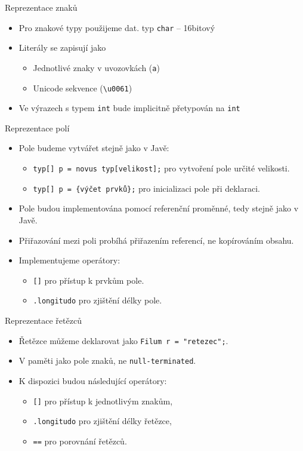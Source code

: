 \documentclass[11pt]{beamer}
\begin{document}
\begin{frame}{Reprezentace znaků}
\begin{itemize}
	\item Pro znakové typy použijeme dat. typ \texttt{char} -- 16bitový
	\item Literály se zapisují jako
	\begin{itemize}
		\item Jednotlivé znaky v uvozovkách (\texttt{\textsc{}a\textsc{}})
		\item Unicode sekvence (\texttt{\textsc{}\textbackslash u0061\textsc{}}) 
	\end{itemize}
	\item Ve výrazech s typem \texttt{int} bude implicitně přetypován na \texttt{int}
\end{itemize}
\end{frame}
\begin{frame}{Reprezentace polí}
\begin{itemize}
        \item Pole budeme vytvářet stejně jako v Javě:
        \begin{itemize}
            \item \texttt{typ[] p = novus typ[velikost];} pro vytvoření pole určité velikosti.
            \item \texttt{typ[] p = \{výčet prvků\};} pro inicializaci pole při deklaraci.
        \end{itemize}
        \item Pole budou implementována pomocí referenční proměnné, tedy stejně jako v Javě.
        \item Přiřazování mezi poli probíhá přiřazením referencí, ne kopírováním obsahu.
        \item Implementujeme operátory:
        \begin{itemize}
            \item \texttt{[]} pro přístup k prvkům pole.
            \item \texttt{.longitudo} pro zjištění délky pole.
        \end{itemize}
    \end{itemize}
\end{frame}
\begin{frame}{Reprezentace řetězců}
\begin{itemize}
        \item Řetězce můžeme deklarovat jako \texttt{Filum r = "retezec";}.
        \item V paměti jako pole znaků, ne \texttt{null-terminated}.
        \item K dispozici budou následující operátory:
        \begin{itemize}
            \item \texttt{[]} pro přístup k jednotlivým znakům,
            \item \texttt{.longitudo} pro zjištění délky řetězce,
            \item \texttt{==} pro porovnání řetězců.
        \end{itemize}
    \end{itemize}
\end{frame}
\end{document}
